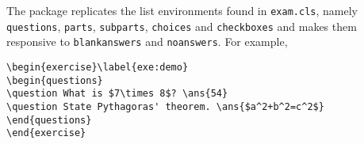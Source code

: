\documentclass{article}
\newtheorem{exercise}{\exercisename}
\begin{document}
The package replicates the list environments found in {\tt exam.cls}, namely {\tt questions}, {\tt parts}, {\tt subparts}, {\tt choices} and {\tt checkboxes} and makes them responsive to {\tt blankanswers} and {\tt noanswers}. For example,

\begin{Verbatim}[frame=single]
\begin{exercise}\label{exe:demo}
\begin{questions}
\question What is $7\times 8$? \ans{54}
\question State Pythagoras' theorem. \ans{$a^2+b^2=c^2$}
\end{questions}
\end{exercise}
\end{Verbatim}

\end{document}
